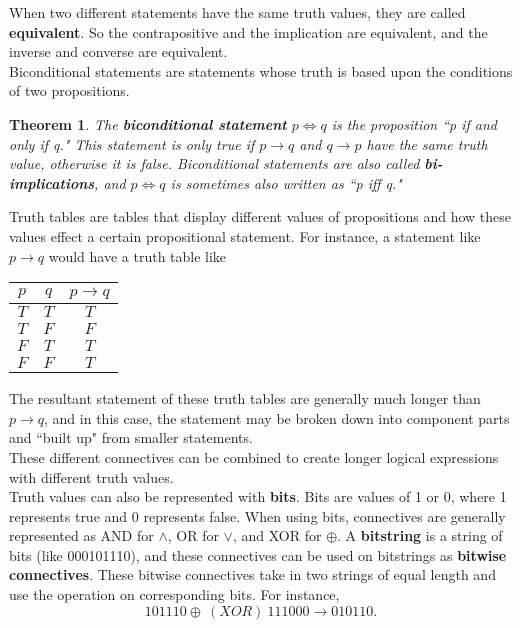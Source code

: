 \documentclass[12pt,letterpaper]{article}
\newtheorem{theorem}{Theorem}
\begin{document}
When two different statements have the same truth values, they are called \textbf{equivalent}. So the contrapositive and the implication are equivalent, and the inverse and converse are equivalent. \\

Biconditional statements are statements whose truth is based upon the conditions of two propositions. 

\begin{theorem}
	The \textbf{biconditional statement} $p \iff q$ is the proposition ``p if and only if q." This statement is only true if $p \rightarrow q$ and $q \rightarrow p$ have the same truth value, otherwise it is false. Biconditional statements are also called \textbf{bi-implications}, and $p \iff q$ is sometimes also written as ``p iff q."
\end{theorem}

Truth tables are tables that display different values of propositions and how these values effect a certain propositional statement. For instance, a statement like $p \rightarrow q$ would have a truth table like 

\begin{center}
\begin{tabular}{|c|c|c|}
	\hline
	$p$ & $q$ & $p \rightarrow q$ \\
	\hline
	$T$ & $T$ & $T$ \\
	\hline
	$T$ & $F$ & $F$ \\
	\hline
	$F$ & $T$ & $T$ \\
	\hline
	$F$ & $F$ & $T$ \\ 
	\hline 
\end{tabular}
\end{center}

The resultant statement of these truth tables are generally much longer than $p \rightarrow q$, and in this case, the statement may be broken down into component parts and ``built up" from smaller statements. \\

These different connectives can be combined to create longer logical expressions with different truth values. \\

Truth values can also be represented with \textbf{bits}. Bits are values of 1 or 0, where 1 represents true and 0 represents false. When using bits, connectives are generally represented as AND for $\wedge$, OR for $\vee$, and XOR for $\oplus$. A \textbf{bitstring} is a string of bits (like 000101110), and these connectives can be used on bitstrings as \textbf{bitwise connectives}. These bitwise connectives take in two strings of equal length and use the operation on corresponding bits. For instance, $$101110 \oplus\ (XOR)\ 111000 \rightarrow 010110.$$ 
\end{document}
